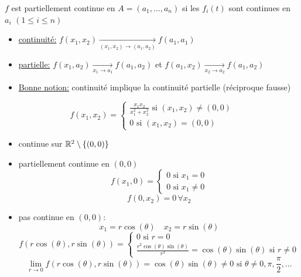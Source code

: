 \begin{definition}
    $f$ est partiellement continue en  $A = (a_1, \ldots, a_n)$ si les $f_i(t)$ sont continues en  $a_i$ $(1 \le i \le n)$
\end{definition}
\begin{itemize}
    \item 
\underline{continuité:} $f(x_1, x_2) \xrightarrow[(x_1, x_2) \to (a_1, a_2)]{}  f(a_1, a_1)$  
    \item 
\underline{partielle:} $f(x_1, a_2) \xrightarrow[x_1 \to a_1]{}   f(a_1, a_2)$ et $f(a_1, x_2) \xrightarrow[x_2 \to a_2]{}  f(a_1, a_2)$
    \item 
\underline{Bonne notion:} continuité implique la continuité partielle (réciproque fausse)
\end{itemize}
\begin{eg}
\[
f(x_1, x_2) = \begin{cases}
    \frac{x_1x_2}{x_1^2 + x_2^2} \text{ si } (x_1, x_2) \neq (0, 0)\\
    0 \text{ si } (x_1, x_2)=(0, 0)
\end{cases}
\]     
\begin{itemize}
    \item continue sur $\mathbb{R}^2 \setminus \{(0, 0)\}$
    \item partiellement continue en $(0, 0)$
         \[
        f(x_1, 0) = \begin{cases}
            0 \text{ si } x_1 = 0\\
            0 \text{ si } x_1 \neq 0
        \end{cases}
        \] 
        \[
        f(0, x_2) = 0 \, \forall x_2
        \] 
    \item pas continue en $(0, 0)$:
         \[
        x_1 = r \cos(\theta) \quad x_2 = r \sin(\theta)
        \] 
        \[
        f(r\cos(\theta), r\sin(\theta)) = \begin{cases}
            0 \text{ si } r = 0\\
            \frac{r^2\cos(\theta)\sin(\theta)}{r^2} = \cos(\theta)\sin(\theta) \text{ si } r \neq 0
        \end{cases}
        \] 
        \[
        \lim_{r \to 0} f(r\cos(\theta), r\sin(\theta)) = \cos(\theta)\sin(\theta) \neq 0 \text{ si } \theta \neq 0, \pi, \frac{\pi}{2}, \ldots
        \] 
\end{itemize}
\end{eg}


